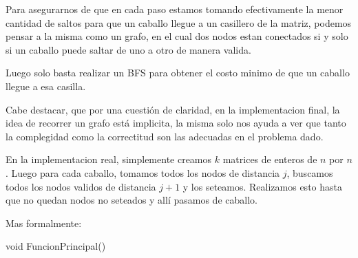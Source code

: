 Para asegurarnos de que en cada paso estamos tomando efectivamente la menor cantidad de saltos para que un caballo llegue a un casillero de la matriz, podemos pensar a la misma como un grafo, en el cual dos nodos estan conectados si y solo si un caballo puede saltar de uno a otro de manera valida.

Luego solo basta realizar un BFS para obtener el costo minimo de que un caballo llegue a esa casilla.

Cabe destacar, que por una cuesti\'on de claridad, en la implementacion final, la idea de recorrer un grafo est\'a implicita, la misma solo nos ayuda a ver que tanto la complegidad como la correctitud son las adecuadas en el problema dado.

En la implementacion real, simplemente creamos $k$ matrices de enteros de $n$ por $n$. Luego para cada caballo, tomamos todos los nodos de distancia $j$, buscamos todos los nodos validos de distancia $j+1$ y los seteamos. Realizamos esto hasta que no quedan nodos no seteados y all\'i pasamos de caballo.

Mas formalmente:

\begin{algorithm}
\begin{algorithmic}[1]\parskip=1mm
\caption{void FuncionPrincipal()}


  
  




  





 
 \end{algorithmic}
\end{algorithm}

